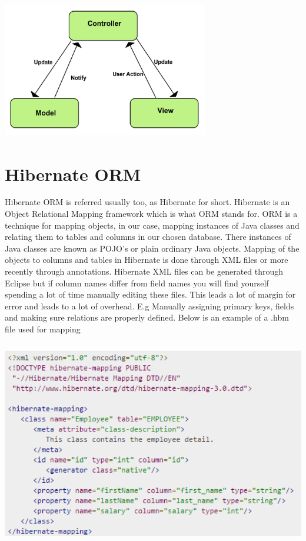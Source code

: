 \begin{center}    
   	\includegraphics[height=6cm, width=9cm]{img/mvc.png}
\end{center}

\section{Hibernate ORM}

Hibernate ORM\cite{Hibernate} is referred usually too, as Hibernate for short. Hibernate is an Object Relational Mapping framework which is what ORM stands for. ORM is a technique for mapping objects, in our case, mapping instances of Java classes and relating them to tables and columns in our chosen database. There instances of Java classes are known as POJO's or plain ordinary Java objects. Mapping of the objects to columns and tables in Hibernate is done through XML\cite{HibernateXML}\cite{XML} files or more recently through annotations\cite{HibernateAnnotations}. Hibernate XML files can be generated through Eclipse but if column names differ from field names you will find yourself spending a lot of time manually editing these files. This leads a lot of margin for error and leads to a lot of overhead. E.g Manually assigning primary keys, fields and making sure relations are properly defined. 
\noindent \newline \newline Below is an example of a .hbm file used for mapping

\begin{center}    
	\includegraphics[height=9cm, width=14cm]{img/hibernatemapping.png}
\end{center}

